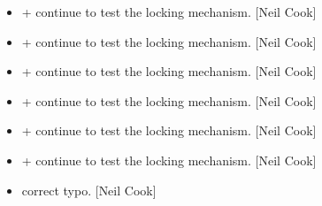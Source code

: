 \documentclass[a4paper,10pt,english]{report}
\begin{document}
\begin{itemize}
\item {} 
 +  \sphinxhyphen{} continue to test the locking mechanism. {[}Neil
Cook{]}

\item {} 
 +  \sphinxhyphen{} continue to test the locking mechanism. {[}Neil
Cook{]}

\item {} 
 +  \sphinxhyphen{} continue to test the locking mechanism. {[}Neil
Cook{]}

\item {} 
 +  \sphinxhyphen{} continue to test the locking mechanism. {[}Neil
Cook{]}

\item {} 
 +  \sphinxhyphen{} continue to test the locking mechanism. {[}Neil
Cook{]}

\item {} 
 +  \sphinxhyphen{} continue to test the locking mechanism. {[}Neil
Cook{]}

\item {} 
 \sphinxhyphen{} correct typo. {[}Neil Cook{]}

\end{itemize}
\end{document}
